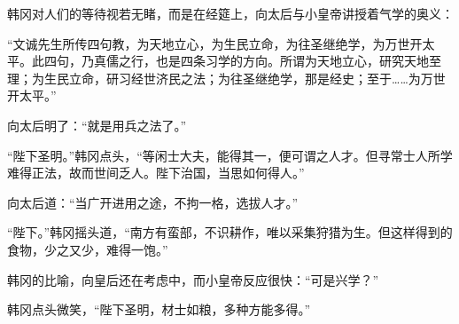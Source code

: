 韩冈对人们的等待视若无睹，而是在经筵上，向太后与小皇帝讲授着气学的奥义：

“文诚先生所传四句教，为天地立心，为生民立命，为往圣继绝学，为万世开太平。此四句，乃真儒之行，也是四条习学的方向。所谓为天地立心，研究天地至理；为生民立命，研习经世济民之法；为往圣继绝学，那是经史；至于……为万世开太平。”

向太后明了：“就是用兵之法了。”

“陛下圣明。”韩冈点头，“等闲士大夫，能得其一，便可谓之人才。但寻常士人所学难得正法，故而世间乏人。陛下治国，当思如何得人。”

向太后道：“当广开进用之途，不拘一格，选拔人才。”

“陛下。”韩冈摇头道，“南方有蛮部，不识耕作，唯以采集狩猎为生。但这样得到的食物，少之又少，难得一饱。”

韩冈的比喻，向皇后还在考虑中，而小皇帝反应很快：“可是兴学？”

韩冈点头微笑，“陛下圣明，材士如粮，多种方能多得。”
